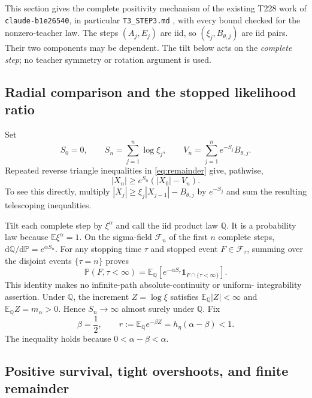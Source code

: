 \documentclass[11pt,a4paper]{article}
\numberwithin{equation}{section}
\theoremstyle{remark}
\newcommand{\E}{\mathbb E}
\newcommand{\Pp}{\mathbb P}
\newcommand{\Q}{\mathbb Q}
\newcommand{\ind}{\mathbf 1}
\begin{document}
This section gives the complete positivity mechanism of the existing T228
work of \texttt{claude-b1e26540}, in particular
\texttt{T3\_STEP3.md} \cite{BrainT3Positive}, with every bound checked for
the nonzero-teacher law. The steps $(A_j,E_j)$ are iid, so
$(\xi_j,B_{\theta,j})$ are iid pairs. Their two components may be
dependent. The tilt below acts on the \emph{complete step}; no teacher
symmetry or rotation argument is used.

\subsection{Radial comparison and the stopped likelihood ratio}

Set
\begin{equation}
 S_0=0,\qquad S_n=\sum_{j=1}^n\log\xi_j,\qquad
 V_n=\sum_{j=1}^n e^{-S_j}B_{\theta,j}.\label{eq:S-V}
\end{equation}
Repeated reverse triangle inequalities in \eqref{eq:remainder} give,
pathwise,
\begin{equation}
 |X_n|\ge e^{S_n}(|X_0|-V_n).\label{eq:radial-lower}
\end{equation}
To see this directly, multiply
$|X_j|\ge\xi_j|X_{j-1}|-B_{\theta,j}$ by $e^{-S_j}$ and sum the
resulting telescoping inequalities.

Tilt each complete step by $\xi^\alpha$ and call the iid product law
$\Q$. It is a probability law because $\E\xi^\alpha=1$.
On the sigma-field $\mathcal F_n$ of the first $n$ complete steps,
$\mathrm d\Q/\mathrm d\Pp=e^{\alpha S_n}$. For any stopping time $\tau$
and stopped event $F\in\mathcal F_\tau$, summing over the disjoint
events $\{\tau=n\}$ proves
\begin{equation}
 \Pp(F,\tau<\infty)
 =\E_\Q\!\left[e^{-\alpha S_\tau}
                    \ind_{F\cap\{\tau<\infty\}}\right].
 \label{eq:stopped-change}
\end{equation}
This identity makes no infinite-path absolute-continuity or uniform-
integrability assertion. Under $\Q$, the increment $Z=\log\xi$ satisfies
$\E_\Q|Z|<\infty$ and $\E_\Q Z=m_\alpha>0$. Hence
$S_n\to\infty$ almost surely under $\Q$. Fix
\begin{equation}
 \beta=\frac12,\qquad
 r:=\E_\Q e^{-\beta Z}=h_\eta(\alpha-\beta)<1.
 \label{eq:r-tilt}
\end{equation}
The inequality holds because $0<\alpha-\beta<\alpha$.

\subsection{Positive survival, tight overshoots, and finite remainder}
\end{document}
